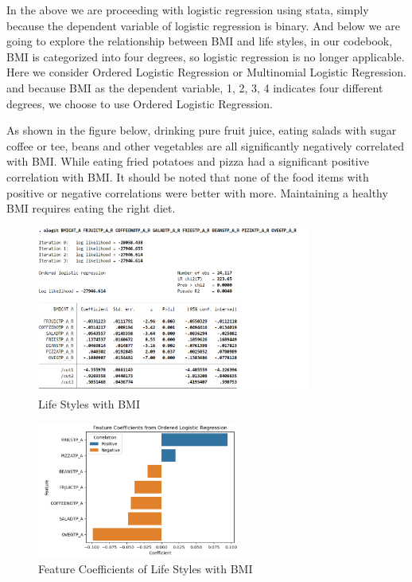 \documentclass{article}
\begin{document}


In the above we are proceeding with logistic regression using stata, simply because the dependent variable of logistic regression is binary. And below we are going to explore the relationship between BMI and life styles, in our codebook, BMI is categorized into four degrees, so logistic regression is no longer applicable. Here we consider Ordered Logistic Regression or Multinomial Logistic Regression. and because BMI as the dependent variable, 1, 2, 3, 4 indicates four different degrees, we choose to use Ordered Logistic Regression.

As shown in the figure below, drinking pure fruit juice, eating salads with sugar coffee or tee, beans and other vegetables are all significantly negatively correlated with BMI. While eating fried potatoes and pizza had a significant positive correlation with BMI. It should be noted that none of the food items with positive or negative correlations were better with more. Maintaining a healthy BMI requires eating the right diet.

\begin{figure}[!h]
	\centering
	\includegraphics[width=0.8\textwidth]{../Image/OL_BMI.jpg}
	\caption{Life Styles with BMI}
	\label{fig:G9}
\end{figure}

\begin{figure}[!h]
	\centering
	\includegraphics[width=0.6\textwidth]{../Image/P46.jpg}
	\caption{Feature Coefficients of Life Styles with BMI}
	\label{fig:P46}
\end{figure}
\end{document}
